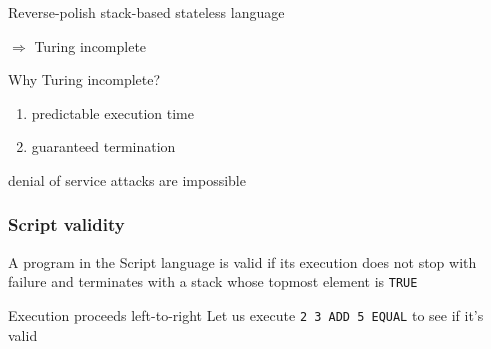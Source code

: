 \documentclass[11pt]{beamer}  %
\begin{document}
\begin{frame}
\begin{greenbox}{Reverse-polish stack-based stateless language}
    \begin{center}
      \alert{$\Rightarrow$ Turing incomplete}
    \end{center}

  \end{greenbox}

  \bigskip

  \begin{greenbox}{Why Turing incomplete?}
    \begin{enumerate}
    \item predictable execution time
    \item guaranteed termination
    \end{enumerate}

    \begin{center}
      denial of service attacks are impossible
    \end{center}

  \end{greenbox}

\end{frame}

\begin{frame}\frametitle{Script validity}

  \begin{greenbox}{}
    A program in the Script language is \alert{valid} if its execution
    does not stop with failure and terminates with a stack whose topmost element is \texttt{TRUE}
  \end{greenbox}

  \bigskip

  \begin{greenbox}{Execution proceeds left-to-right}
    Let us execute \texttt{2 3 ADD 5 EQUAL} to see if it's valid
  \end{greenbox}

\end{frame}
\end{document}
